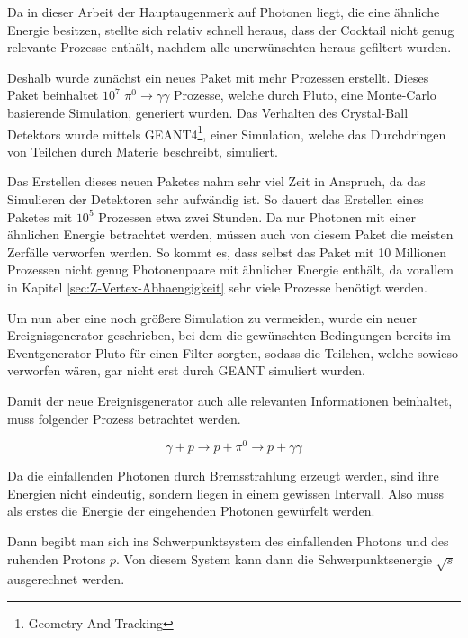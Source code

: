 \documentclass[a4paper,11pt,oneside,final,german,openbib,pdftex]{scrbook}
\begin{document}
{Da in dieser Arbeit der Hauptaugenmerk auf Photonen liegt, die eine \"ahnliche Energie besitzen, stellte sich relativ schnell heraus, dass der Cocktail nicht genug relevante Prozesse enth\"alt, nachdem alle unerw\"unschten heraus gefiltert wurden. 

Deshalb wurde zun\"achst ein neues Paket mit mehr Prozessen erstellt. 
Dieses Paket beinhaltet $10^7$ $\pi^0 \rightarrow \gamma \gamma$ Prozesse, welche durch Pluto, eine Monte-Carlo basierende Simulation, generiert wurden. Das Verhalten des Crystal-Ball Detektors wurde mittels GEANT4\footnote{Geometry And Tracking}, einer Simulation, welche das Durchdringen von Teilchen durch Materie beschreibt, simuliert.

Das Erstellen dieses neuen Paketes nahm sehr viel Zeit in Anspruch, da das Simulieren der Detektoren sehr aufw\"andig ist. So dauert das Erstellen eines Paketes mit $10^5$ Prozessen etwa zwei Stunden. Da nur Photonen mit einer \"ahnlichen Energie betrachtet werden, m\"ussen auch von diesem Paket die meisten Zerf\"alle verworfen werden. So kommt es, dass selbst das Paket mit 10 Millionen Prozessen nicht genug Photonenpaare mit \"ahnlicher Energie enth\"alt, da vorallem in Kapitel \ref{sec:Z-Vertex-Abhaengigkeit} sehr viele Prozesse ben\"otigt werden.

Um nun aber eine noch größere Simulation zu vermeiden, wurde ein neuer Ereignisgenerator geschrieben, bei dem die gew\"unschten Bedingungen bereits im Eventgenerator Pluto f\"ur einen Filter sorgten, sodass die Teilchen, welche sowieso verworfen w\"aren, gar nicht erst durch GEANT simuliert wurden. 

Damit der neue Ereignisgenerator auch alle relevanten Informationen beinhaltet, muss folgender Prozess betrachtet werden.

\begin{equation}
\gamma + p \rightarrow p + \pi^0 \rightarrow p + \gamma \gamma 
\end{equation}

Da die einfallenden Photonen durch Bremsstrahlung erzeugt werden, sind ihre Energien nicht eindeutig, sondern liegen in einem gewissen Intervall. Also muss als erstes die Energie der eingehenden Photonen gew\"urfelt werden.

Dann begibt man sich ins Schwerpunktsystem des einfallenden Photons und des ruhenden Protons $p$. 
Von diesem System kann dann die Schwerpunktsenergie $\sqrt{s}$ ausgerechnet werden.

}
\end{document}
